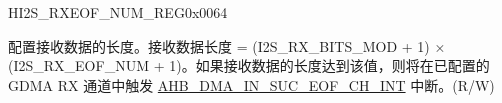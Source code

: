 \begin{register}{H}{I2S\_RXEOF\_NUM\_REG}{0x0064}\label{regdesc:I2SRXEOFNUMREG}
%
%
\regnewline%
\begin{regdesc}\begin{reglist}
\label{fielddesc:I2SRXEOFNUM}\item [I2S\_RX\_EOF\_NUM] 配置接收数据的长度。接收数据长度 = (I2S\_RX\_BITS\_MOD + 1) × (I2S\_RX\_EOF\_NUM + 1)。如果接收数据的长度达到该值，则将在已配置的 GDMA RX 通道中触发 \hyperref[int:GDMAINSUCEOFINT]{AHB\_DMA\_IN\_SUC\_EOF\_CH\_INT} 中断。(R/W)
\end{reglist}\end{regdesc}
\end{register}


